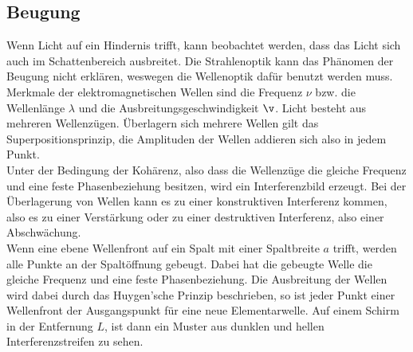 \subsection{Beugung}
\label{subsec:Beugung}
Wenn Licht auf ein Hindernis trifft, kann beobachtet werden, dass das Licht sich auch im Schattenbereich ausbreitet.
Die Strahlenoptik kann das Phänomen der Beugung nicht erklären, weswegen die Wellenoptik dafür benutzt werden muss.
Merkmale der elektromagnetischen Wellen sind die Frequenz $\nu$ bzw. die Wellenlänge $\lambda$ und die Ausbreitungsgeschwindigkeit $\v$.
Licht besteht aus mehreren Wellenzügen.
Überlagern sich mehrere Wellen gilt das Superpositionsprinzip, die Amplituden der Wellen addieren sich also in jedem Punkt.\\
Unter der Bedingung der Kohärenz, also dass die Wellenzüge die gleiche Frequenz und eine feste Phasenbeziehung besitzen, wird ein Interferenzbild erzeugt.
Bei der Überlagerung von Wellen kann es zu einer konstruktiven Interferenz kommen, also es zu einer  Verstärkung oder zu einer destruktiven
Interferenz, also einer Abschwächung.\\
Wenn eine ebene Wellenfront auf ein Spalt mit einer Spaltbreite $a$ trifft, werden alle Punkte an der Spaltöffnung gebeugt.
Dabei hat die gebeugte Welle die gleiche Frequenz und eine feste Phasenbeziehung.
Die Ausbreitung der Wellen wird dabei durch das Huygen'sche Prinzip beschrieben, so ist jeder Punkt einer Wellenfront der Ausgangspunkt
für eine neue Elementarwelle.
Auf einem Schirm in der Entfernung $L$, ist dann ein Muster aus dunklen und hellen Interferenzstreifen zu sehen.

